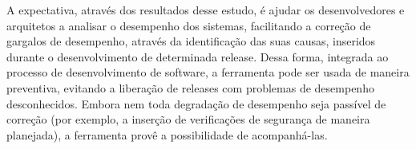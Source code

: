 

A expectativa, através dos resultados desse estudo, é ajudar os desenvolvedores e arquitetos a analisar o desempenho dos sistemas, facilitando a correção de gargalos de desempenho, através da identificação das suas causas, inseridos durante o desenvolvimento de determinada release. Dessa forma, integrada ao processo de desenvolvimento de software, a ferramenta pode ser usada de maneira preventiva, evitando a liberação de releases com problemas de desempenho desconhecidos. Embora nem toda degradação de desempenho seja passível de correção (por exemplo, a inserção de verificações de segurança de maneira planejada), a ferramenta provê a possibilidade de acompanhá-las.

